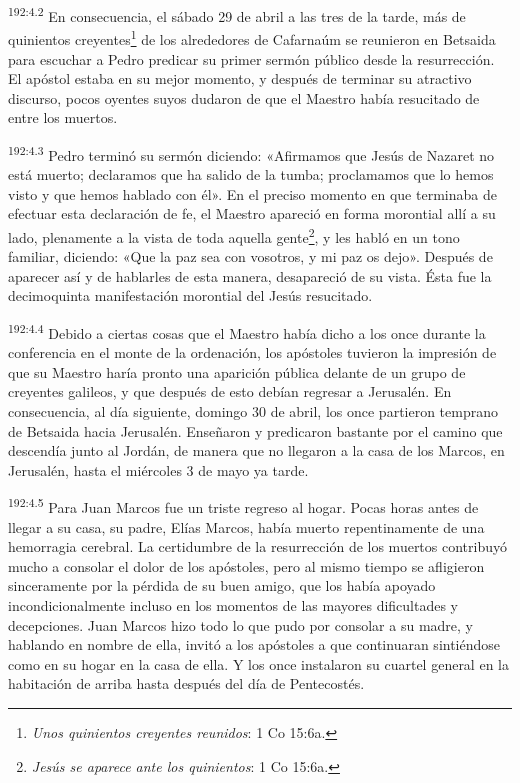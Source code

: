 \par
\textsuperscript{192:4.2} En consecuencia, el sábado 29 de abril a las tres de la tarde, más de quinientos creyentes\footnote{\textit{Unos quinientos creyentes reunidos}: 1 Co 15:6a.} de los alrededores de Cafarnaúm se reunieron en Betsaida para escuchar a Pedro predicar su primer sermón público desde la resurrección. El apóstol estaba en su mejor momento, y después de terminar su atractivo discurso, pocos oyentes suyos dudaron de que el Maestro había resucitado de entre los muertos.

\par
\textsuperscript{192:4.3} Pedro terminó su sermón diciendo: «Afirmamos que Jesús de Nazaret no está muerto; declaramos que ha salido de la tumba; proclamamos que lo hemos visto y que hemos hablado con él». En el preciso momento en que terminaba de efectuar esta declaración de fe, el Maestro apareció en forma morontial allí a su lado, plenamente a la vista de toda aquella gente\footnote{\textit{Jesús se aparece ante los quinientos}: 1 Co 15:6a.}, y les habló en un tono familiar, diciendo: «Que la paz sea con vosotros, y mi paz os dejo». Después de aparecer así y de hablarles de esta manera, desapareció de su vista. Ésta fue la decimoquinta manifestación morontial del Jesús resucitado.

\par
\textsuperscript{192:4.4} Debido a ciertas cosas que el Maestro había dicho a los once durante la conferencia en el monte de la ordenación, los apóstoles tuvieron la impresión de que su Maestro haría pronto una aparición pública delante de un grupo de creyentes galileos, y que después de esto debían regresar a Jerusalén. En consecuencia, al día siguiente, domingo 30 de abril, los once partieron temprano de Betsaida hacia Jerusalén. Enseñaron y predicaron bastante por el camino que descendía junto al Jordán, de manera que no llegaron a la casa de los Marcos, en Jerusalén, hasta el miércoles 3 de mayo ya tarde.

\par
\textsuperscript{192:4.5} Para Juan Marcos fue un triste regreso al hogar. Pocas horas antes de llegar a su casa, su padre, Elías Marcos, había muerto repentinamente de una hemorragia cerebral. La certidumbre de la resurrección de los muertos contribuyó mucho a consolar el dolor de los apóstoles, pero al mismo tiempo se afligieron sinceramente por la pérdida de su buen amigo, que los había apoyado incondicionalmente incluso en los momentos de las mayores dificultades y decepciones. Juan Marcos hizo todo lo que pudo por consolar a su madre, y hablando en nombre de ella, invitó a los apóstoles a que continuaran sintiéndose como en su hogar en la casa de ella. Y los once instalaron su cuartel general en la habitación de arriba hasta después del día de Pentecostés.


